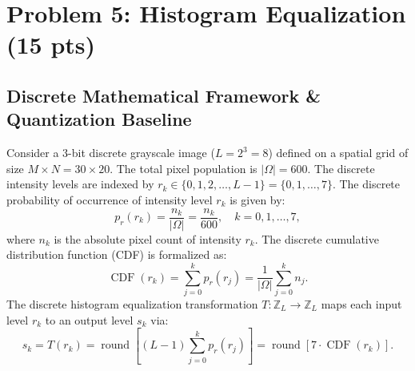 \documentclass[11pt,a4paper]{article}
\begin{document}
\section{Problem 5: Histogram Equalization (15 pts)}

\subsection{Discrete Mathematical Framework \& Quantization Baseline}
Consider a 3-bit discrete grayscale image ($L = 2^3 = 8$) defined on a spatial grid of size $M \times N = 30 \times 20$. The total pixel population is $|\Omega| = 600$.
The discrete intensity levels are indexed by $r_k \in \{0, 1, 2, \dots, L-1\} = \{0, 1, \dots, 7\}$.
The discrete probability of occurrence of intensity level $r_k$ is given by:
\begin{equation}
p_r(r_k) = \frac{n_k}{|\Omega|} = \frac{n_k}{600}, \quad k = 0, 1, \dots, 7,
\end{equation}
where $n_k$ is the absolute pixel count of intensity $r_k$.
The discrete cumulative distribution function (CDF) is formalized as:
\begin{equation}
\operatorname{CDF}(r_k) = \sum_{j=0}^k p_r(r_j) = \frac{1}{|\Omega|} \sum_{j=0}^k n_j.
\end{equation}
The discrete histogram equalization transformation $T: \mathbb{Z}_L \to \mathbb{Z}_L$ maps each input level $r_k$ to an output level $s_k$ via:
\begin{equation}
s_k = T(r_k) = \operatorname{round}\left[ (L - 1) \sum_{j=0}^k p_r(r_j) \right] = \operatorname{round}\left[ 7 \cdot \operatorname{CDF}(r_k) \right].
\end{equation}
\end{document}
